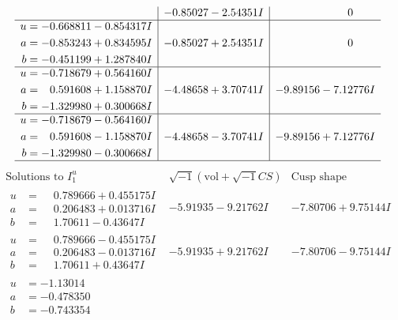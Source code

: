 \documentclass[1p]{elsarticle_modified}
\theoremstyle{definition}
\newcommand{\I}{\sqrt{-1}}
\begin{document}
$$\begin{array}{c|c|c}
 & -0.85027 - 2.54351 I & \phantom{-0.000000 } 0 \\ \hline\begin{aligned}
u &= -0.668811 - 0.854317 I \\
a &= -0.853243 + 0.834595 I \\
b &= -0.451199 + 1.287840 I\end{aligned}
 & -0.85027 + 2.54351 I & \phantom{-0.000000 } 0 \\ \hline\begin{aligned}
u &= -0.718679 + 0.564160 I \\
a &= \phantom{-}0.591608 + 1.158870 I \\
b &= -1.329980 + 0.300668 I\end{aligned}
 & -4.48658 + 3.70741 I & -9.89156 - 7.12776 I \\ \hline\begin{aligned}
u &= -0.718679 - 0.564160 I \\
a &= \phantom{-}0.591608 - 1.158870 I \\
b &= -1.329980 - 0.300668 I\end{aligned}
 & -4.48658 - 3.70741 I & -9.89156 + 7.12776 I\\
 \hline 
 \end{array}$$\newpage$$\begin{array}{c|c|c}  
\text{Solutions to }I^u_{1}& \I (\text{vol} + \sqrt{-1}CS) & \text{Cusp shape}\\
 \hline 
\begin{aligned}
u &= \phantom{-}0.789666 + 0.455175 I \\
a &= \phantom{-}0.206483 + 0.013716 I \\
b &= \phantom{-}1.70611 - 0.43647 I\end{aligned}
 & -5.91935 - 9.21762 I & -7.80706 + 9.75144 I \\ \hline\begin{aligned}
u &= \phantom{-}0.789666 - 0.455175 I \\
a &= \phantom{-}0.206483 - 0.013716 I \\
b &= \phantom{-}1.70611 + 0.43647 I\end{aligned}
 & -5.91935 + 9.21762 I & -7.80706 - 9.75144 I \\ \hline\begin{aligned}
u &= -1.13014\phantom{ +0.000000I} \\
a &= -0.478350\phantom{ +0.000000I} \\
b &= -0.743354\phantom{ +0.000000I}\end{aligned}

\end{array}$$
\end{document}
